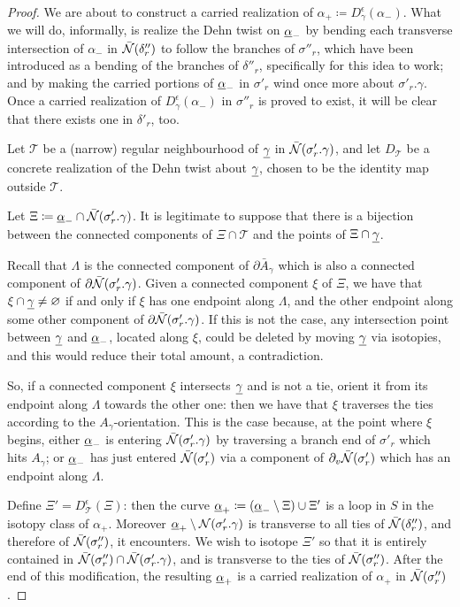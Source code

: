 \begin{proof}
We are about to construct a carried realization of $\alpha_+\coloneqq D_\gamma^\epsilon(\alpha_-)$. What we will do, informally, is realize the Dehn twist on $\underline{\alpha}_-$ by bending each transverse intersection of $\alpha_-$ in $\bar{{\mathcal N}}(\delta''_r)$ to follow the branches of $\sigma''_r$, which have been introduced as a bending of the branches of $\delta''_r$, specifically for this idea to work; and by making the carried portions of $\underline{\alpha}_-$ in $\sigma'_r$ wind once more about $\sigma'_r.\gamma$. Once a carried realization of $D_\gamma^\epsilon(\alpha_-)$ in $\sigma''_r$ is proved to exist, it will be clear that there exists one in $\delta'_r$, too.

Let $\mathcal T$ be a (narrow) regular neighbourhood of $\underline{\gamma}$ in $\bar{{\mathcal N}}(\sigma'_r.\gamma)$, and let $D_{\mathcal T}$ be a concrete realization of the Dehn twist about $\underline{\gamma}$, chosen to be the identity map outside $\mathcal T$.

Let $\Xi\coloneqq \underline{\alpha}_-\cap\bar{{\mathcal N}}(\sigma'_r.\gamma)$. It is legitimate to suppose that there is a bijection between the connected components of $\Xi\cap \mathcal T$ and the points of $\Xi\cap\underline{\gamma}$.

Recall that $\Lambda$ is the connected component of $\partial\bar A_\gamma$ which is also a connected component of $\partial\bar{{\mathcal N}}(\sigma'_r.\gamma)$. Given a connected component $\xi$ of $\Xi$, we have that $\xi\cap \underline{\gamma}\not=\varnothing$ if and only if $\xi$ has one endpoint along $\Lambda$, and the other endpoint along some other component of $\partial\bar{{\mathcal N}}(\sigma'_r.\gamma)$. If this is not the case, any intersection point between $\underline{\gamma}$ and $\underline{\alpha}_-$, located along $\xi$, could be deleted by moving $\underline{\gamma}$ via isotopies, and this would reduce their total amount, a contradiction.

So, if a connected component $\xi$ intersects $\underline{\gamma}$ and is not a tie, orient it from its endpoint along $\Lambda$ towards the other one: then we have that $\xi$ traverses the ties according to the $A_\gamma$-orientation. This is the case because, at the point where $\xi$ begins, either $\underline{\alpha}_-$ is entering $\bar{{\mathcal N}}(\sigma'_r.\gamma)$ by traversing a branch end of $\sigma'_r$ which hits $A_\gamma$; or $\underline{\alpha}_-$ has just entered $\bar{{\mathcal N}}(\sigma'_r)$ via a component of $\partial_v\bar{{\mathcal N}}(\sigma'_r)$ which has an endpoint along $\Lambda$.

Define $\Xi'=D_{\mathcal T}^\epsilon(\Xi)$: then the curve $\underline{\alpha}_+\coloneqq (\underline{\alpha}_-\setminus\Xi)\cup\Xi'$ is a loop in $S$ in the isotopy class of $\alpha_+$. Moreover $\underline{\alpha}_+\setminus {\mathcal N}(\sigma'_r.\gamma)$ is transverse to all ties of $\bar{{\mathcal N}}(\delta''_r)$, and therefore of $\bar{{\mathcal N}}(\sigma''_r)$, it encounters. We wish to isotope $\Xi'$ so that it is entirely contained in $\bar{{\mathcal N}}(\sigma''_r)\cap\bar{{\mathcal N}}(\sigma'_r.\gamma)$, and is transverse to the ties of $\bar{{\mathcal N}}(\sigma''_r)$. After the end of this modification, the resulting $\underline{\alpha}_+$ is a carried realization of $\alpha_+$ in $\bar{{\mathcal N}}(\sigma''_r)$.


\end{proof}
